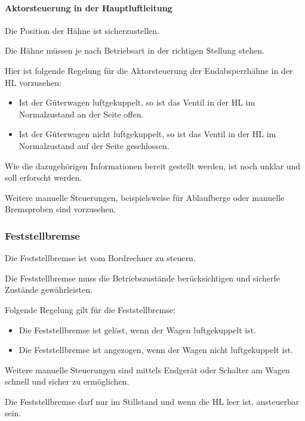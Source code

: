 \paragraph{Aktorsteuerung in der Hauptluftleitung}
\begin{feat}
Die Position der Hähne ist sicherzustellen.
\end{feat}
\begin{feat}
Die Hähne müssen je nach Betriebsart in der richtigen Stellung stehen.
\end{feat}
\begin{feat}
Hier ist folgende Regelung für die Aktorsteuerung der Endabsperrhähne in der \acrshort{HL} vorzusehen:
\begin{itemize}
    \item Ist der Güterwagen luftgekuppelt, so ist das Ventil in der \acrshort{HL} im Normalzustand an der Seite offen.
    \item Ist der Güterwagen nicht luftgekuppelt, so ist das Ventil in der \acrshort{HL} im Normalzustand auf der Seite geschlossen.
\end{itemize}
\end{feat}
\begin{rem}[zu Anf. 52]
Wie die dazugehörigen Informationen bereit gestellt werden, ist noch unklar und soll erforscht werden.
\end{rem}
\begin{rem}[zu Anf. 52]
Weitere manuelle Steuerungen, beispielsweise für Ablaufberge oder manuelle Bremsproben sind vorzusehen.
\end{rem}

\subsubsection{Feststellbremse}
\begin{feat}
Die Feststellbremse ist vom Bordrechner zu steuern.
\end{feat}
\begin{feat}
Die Feststellbremse muss die Betriebszustände berücksichtigen und sicherfe Zustände gewährleisten.
\end{feat}
\begin{feat}
Folgende Regelung gilt für die Feststellbremse:
\begin{itemize}
    \item Die Feststellbremse ist gelöst, wenn der Wagen luftgekuppelt ist.
    \item Die Feststellbremse ist angezogen, wenn der Wagen nicht luftgekuppelt ist.
\end{itemize}
\end{feat}
\begin{rem} [zu Anf. 55]
Weitere manuelle Steuerungen sind mittels Endgerät oder \newline Schalter am Wagen schnell und sicher zu ermöglichen.
\end{rem}
\begin{feat}
Die Feststellbremse darf nur im Stillstand und wenn die HL leer ist, ansteuerbar sein.
\end{feat}


